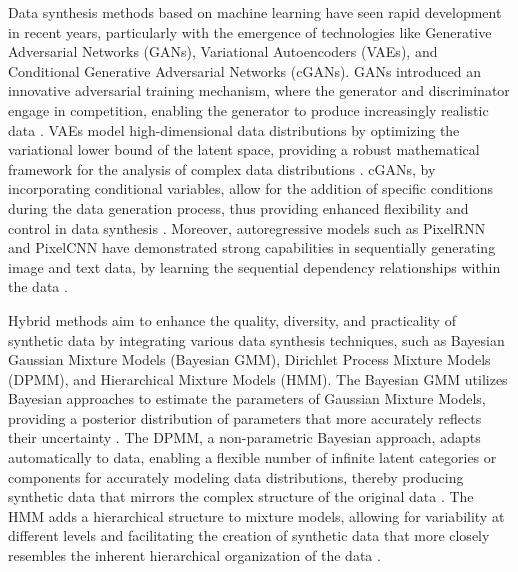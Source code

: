 \documentclass[final,3p,times]{elsarticle}
\begin{document}
Data synthesis methods based on machine learning have seen rapid 
development in recent years, particularly with the emergence of 
technologies like Generative Adversarial Networks (GANs), Variational 
Autoencoders (VAEs), and Conditional Generative Adversarial Networks 
(cGANs). GANs introduced an innovative adversarial training mechanism, 
where the generator and discriminator engage in competition, enabling 
the generator to produce increasingly realistic data \cite{bib37,bib36,bib38}. VAEs 
model high-dimensional data distributions by optimizing the 
variational lower bound of the latent space, providing a robust 
mathematical framework for the analysis of complex data 
distributions \cite{bib40,bib39}. cGANs, by incorporating conditional variables, 
allow for the addition of specific conditions during the data 
generation process, thus providing enhanced flexibility and control 
in data synthesis \cite{bib41,bib42}. Moreover, autoregressive models such as 
PixelRNN and PixelCNN have demonstrated strong capabilities in 
sequentially generating image and text data, by learning the 
sequential dependency relationships within the data \cite{bib43,bib44}.

Hybrid methods aim to enhance the quality, diversity, and 
practicality of synthetic data by integrating various data synthesis 
techniques, such as Bayesian Gaussian Mixture Models (Bayesian GMM), 
Dirichlet Process Mixture Models (DPMM), and Hierarchical Mixture 
Models (HMM). The Bayesian GMM utilizes Bayesian approaches to 
estimate the parameters of Gaussian Mixture Models, providing a 
posterior distribution of parameters that more accurately reflects 
their uncertainty \cite{bib46,bib47}. The DPMM, a non-parametric Bayesian 
approach, adapts automatically to data, enabling a flexible number 
of infinite latent categories or components for accurately modeling 
data distributions, thereby producing synthetic data that mirrors 
the complex structure of the original data \cite{bib48,bib49}. The HMM adds a 
hierarchical structure to mixture models, allowing for variability 
at different levels and facilitating the creation of synthetic data 
that more closely resembles the inherent hierarchical organization of 
the data \cite{bib51}.
\end{document}
